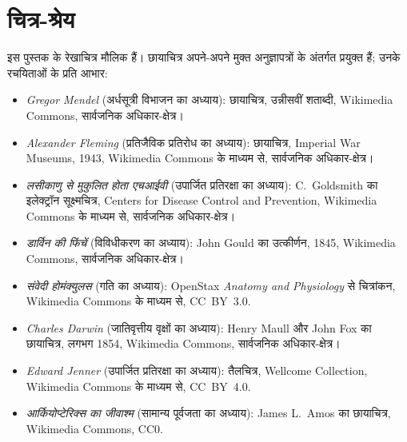 \chapter*{चित्र-श्रेय}

\begingroup\sloppy

इस पुस्तक के रेखाचित्र मौलिक हैं। छायाचित्र अपने-अपने मुक्त अनुज्ञापत्रों के
अंतर्गत प्रयुक्त हैं; उनके रचयिताओं के प्रति आभार:

\begin{itemize}
  \item \emph{Gregor Mendel} (अर्धसूत्री विभाजन का अध्याय): छायाचित्र,
        उन्नीसवीं शताब्दी, Wikimedia Commons, सार्वजनिक अधिकार-क्षेत्र।
  \item \emph{Alexander Fleming} (प्रतिजैविक प्रतिरोध का अध्याय):
        छायाचित्र, Imperial War Museums, 1943, Wikimedia Commons के
        माध्यम से, सार्वजनिक अधिकार-क्षेत्र।
  \item \emph{लसीकाणु से मुकुलित होता एचआईवी} (उपार्जित प्रतिरक्षा का
        अध्याय): C.~Goldsmith का इलेक्ट्रॉन सूक्ष्मचित्र, Centers for
        Disease Control and Prevention, Wikimedia Commons के माध्यम से,
        सार्वजनिक अधिकार-क्षेत्र।
  \item \emph{डार्विन की फिंचें} (विविधीकरण का अध्याय): John Gould का
        उत्कीर्णन, 1845, Wikimedia Commons, सार्वजनिक अधिकार-क्षेत्र।
  \item \emph{संवेदी होमंक्युलस} (गति का अध्याय): OpenStax
        \emph{Anatomy and Physiology} से चित्रांकन, Wikimedia Commons
        के माध्यम से, CC~BY~3.0.
  \item \emph{Charles Darwin} (जातिवृत्तीय वृक्षों का अध्याय):
        Henry Maull और John Fox का छायाचित्र, लगभग 1854, Wikimedia
        Commons, सार्वजनिक अधिकार-क्षेत्र।
  \item \emph{Edward Jenner} (उपार्जित प्रतिरक्षा का अध्याय): तैलचित्र,
        Wellcome Collection, Wikimedia Commons के माध्यम से,
        CC~BY~4.0.
  \item \emph{आर्कियोप्टेरिक्स का जीवाश्म} (सामान्य पूर्वजता का अध्याय):
        James L.~Amos का छायाचित्र, Wikimedia Commons, CC0.
\end{itemize}


